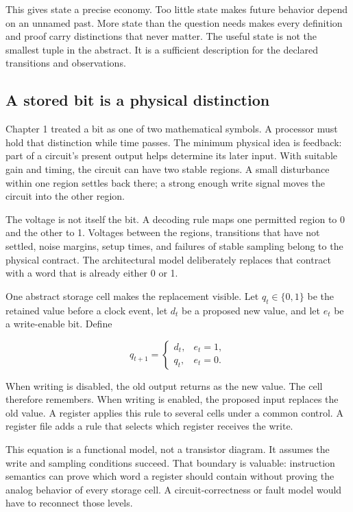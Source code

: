 This gives state a precise economy. Too little state makes future behavior
depend on an unnamed past. More state than the question needs makes every
definition and proof carry distinctions that never matter. The useful state
is not the smallest tuple in the abstract. It is a sufficient description for
the declared transitions and observations.

\subsection{A stored bit is a physical distinction}

Chapter 1 treated a bit as one of two mathematical symbols. A processor must
hold that distinction while time passes. The minimum physical idea is
feedback: part of a circuit's present output helps determine its later input.
With suitable gain and timing, the circuit can have two stable regions. A
small disturbance within one region settles back there; a strong enough write
signal moves the circuit into the other region.

The voltage is not itself the bit. A decoding rule maps one permitted region
to 0 and the other to 1. Voltages between the regions, transitions that have
not settled, noise margins, setup times, and failures of stable sampling
belong to the physical contract. The architectural model deliberately replaces
that contract with a word that is already either 0 or 1.

One abstract storage cell makes the replacement visible. Let
\(q_t\in\{0,1\}\) be the retained value before a clock event, let \(d_t\) be
a proposed new value, and let \(e_t\) be a write-enable bit. Define

\[
q_{t+1}=
\left\{\begin{array}{ll}
d_t, & e_t=1,\\
q_t, & e_t=0.
\end{array}\right.
\]

When writing is disabled, the old output returns as the new value. The cell
therefore remembers. When writing is enabled, the proposed input replaces the
old value. A register applies this rule to several cells under a common
control. A register file adds a rule that selects which register receives the
write.

This equation is a functional model, not a transistor diagram. It assumes the
write and sampling conditions succeed. That boundary is valuable: instruction
semantics can prove which word a register should contain without proving the
analog behavior of every storage cell. A circuit-correctness or fault model
would have to reconnect those levels.

